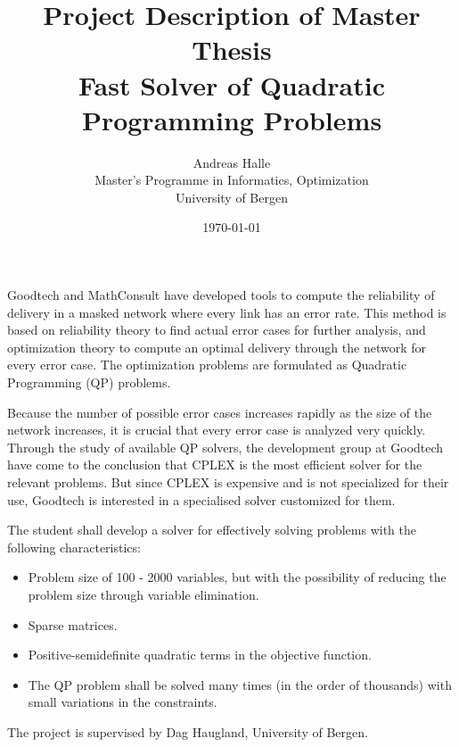 \documentclass[a4paper]{article}
\begin{document}
\title{Project Description of Master Thesis\\
  \large Fast Solver of Quadratic Programming Problems}
\author{Andreas Halle\\
  Master's Programme in Informatics, Optimization\\
  University of Bergen}
\date{\today}
\maketitle
\thispagestyle{empty}

Goodtech and MathConsult have developed tools to compute the reliability of delivery in a masked network where every link has an error rate. This method is based on reliability theory to find actual error cases for further analysis, and optimization theory to compute an optimal delivery through the network for every error case. The optimization problems are formulated as Quadratic Programming (QP) problems.

Because the number of possible error cases increases rapidly as the size of the network increases, it is crucial that every error case is analyzed very quickly. Through the study of available QP solvers, the development group at Goodtech have come to the conclusion that CPLEX is the most efficient solver for the relevant problems. But since CPLEX is expensive and is not specialized for their use, Goodtech is interested in a specialised solver customized for them.

The student shall develop a solver for effectively solving problems with the following characteristics:
\begin{itemize}
  \item Problem size of 100 - 2000 variables, but with the possibility of reducing the problem size through variable elimination.
  \item Sparse matrices.
  \item Positive-semidefinite quadratic terms in the objective function.
  \item The QP problem shall be solved many times (in the order of thousands) with small variations in the constraints.
\end{itemize}

The project is supervised by Dag Haugland, University of Bergen.
\end{document}

